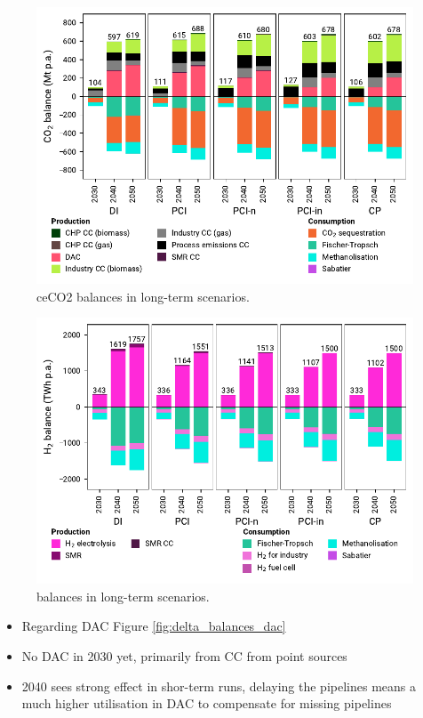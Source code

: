 \documentclass[preprint,12pt,sort&compress]{elsarticle}
\begin{document}
\begin{figure}[htbp]
  \centering
  \includegraphics[width=\textwidth]{balances_overview_co2 stored}
  \caption{ce{CO2} balances in long-term scenarios.}
  \label{fig:balances_overview_co2_stored}
\end{figure}

\begin{figure}[htbp]
  \centering
  \includegraphics[width=\textwidth]{balances_overview_H2}
  \caption{ balances in long-term scenarios.}
  \label{fig:balances_overview_H2_stored}
\end{figure}


\begin{itemize}
  \item Regarding DAC Figure \ref{fig:delta_balances_dac}
  \item No DAC in 2030 yet, primarily from CC from point sources
  \item 2040 sees strong effect in shor-term runs, delaying the pipelines means a much higher utilisation in DAC to compensate for missing pipelines
\end{itemize}
\end{document}
